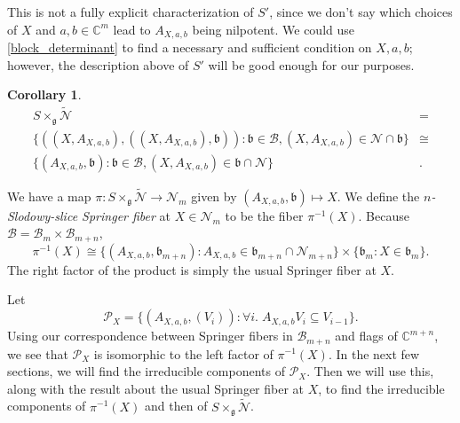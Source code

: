 \documentclass[12pt,psamsfonts]{article}
\newtheorem{corollary}[theorem]{Corollary}
\begin{document}
This is not a fully explicit characterization of \(S'\), since we don't say which choices of \(X\) and \(a, b \in \mathbb{C}^m\) lead to \(A_{X, a, b}\) being nilpotent.
We could use \cref{block_determinant} to find a necessary and sufficient condition on \(X, a, b\); however, the description above of \(S'\) will be good enough for our purposes.
\begin{corollary}\label{sn_iso}
    \begin{align*}
        S \times_\mathfrak{g} \widetilde{\mathcal{N}} & = \\
        \{((X, A_{X, a, b}), ((X, A_{X, a, b}), \mathfrak{b})) : \mathfrak{b} \in \mathcal{B}, (X, A_{X, a, b}) \in \mathcal{N} \cap \mathfrak{b}\} & \cong \\
        \{(A_{X, a, b}, \mathfrak{b}) : \mathfrak{b} \in \mathcal{B}, (X, A_{X, a, b}) \in \mathfrak{b} \cap \mathcal{N}\} & .
    \end{align*}
\end{corollary}
We have a map \(\pi : S \times_\mathfrak{g} \widetilde{\mathcal{N}} \to \mathcal{N}_m\) given by \((A_{X, a, b}, \mathfrak{b}) \mapsto X\).
We define the \emph{\(n\)-Slodowy-slice Springer fiber} at \(X \in \mathcal{N}_m\) to be the fiber \(\pi^{-1}(X)\).
Because \(\mathcal{B} = \mathcal{B}_m \times \mathcal{B}_{m + n}\),  
\[\pi^{-1}(X) \cong \{(A_{X, a, b}, \mathfrak{b}_{m + n}) : A_{X, a, b} \in \mathfrak{b}_{m + n} \cap \mathcal{N}_{m + n}\} \times \{\mathfrak{b}_m : X \in \mathfrak{b}_m\}.\]
The right factor of the product is simply the usual Springer fiber at \(X\).
\par Let 
\[\mathcal{P}_X = \{(A_{X, a, b}, (V_i)) : \forall i. \; A_{X, a, b} V_i \subseteq V_{i - 1}\}.\]
Using our correspondence between Springer fibers in \(\mathcal{B}_{m + n}\) and flags of \(\mathbb{C}^{m + n}\), we see that \(\mathcal{P}_X\) is isomorphic to the left factor of \(\pi^{-1}(X)\).
In the next few sections, we will find the irreducible components of \(\mathcal{P}_X\).
Then we will use this, along with the result about the usual Springer fiber at \(X\), to find the irreducible components of \(\pi^{-1}(X)\) and then of \(S \times_\mathfrak{g} \widetilde{\mathcal{N}}\).
\end{document}
